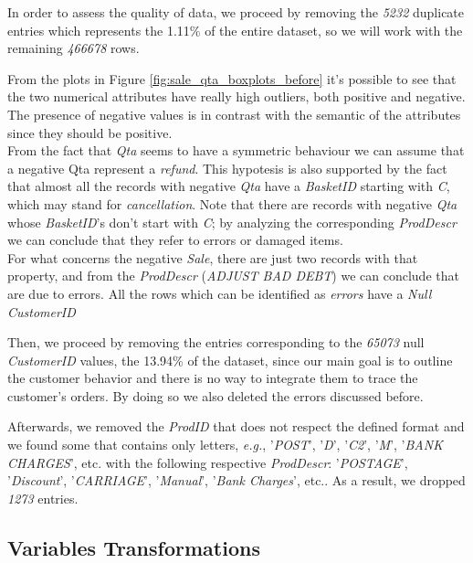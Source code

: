 In order to assess the quality of data, we proceed by removing the \emph{5232} duplicate entries which represents the 1.11\% of the entire dataset, so we will work with the remaining \emph{466678} rows.

From the plots in Figure \ref{fig:sale_qta_boxplots_before} it's possible to see that the two numerical attributes have really high outliers, both positive and negative. The presence of negative values is in contrast with the semantic of the attributes since they should be positive.\\
From the fact that \emph{Qta} seems to have a symmetric behaviour we can assume that a negative Qta represent a \emph{refund}. This hypotesis is also supported by the fact that almost all the records with negative \emph{Qta} have a \emph{BasketID} starting with \emph{C}, which may stand for \emph{cancellation}. Note that there are records with negative \emph{Qta} whose \emph{BasketID}'s don't start with \emph{C}; by analyzing the corresponding \emph{ProdDescr} we can conclude that they refer to errors or damaged items.\\
For what concerns the negative \emph{Sale}, there are just two records with that property, and from the \emph{ProdDescr} (\emph{ADJUST BAD DEBT}) we can conclude that are due to errors. All the rows which can be identified as \emph{errors} have a \emph{Null} \emph{CustomerID}

Then, we proceed by removing the entries corresponding to the \emph{65073} null \emph{CustomerID} values, the 13.94\% of the dataset, since our main goal is to outline the customer behavior and there is no way to integrate them to trace the customer's orders. By doing so we also deleted the errors discussed before.

Afterwards, we removed the \emph{ProdID} that does not respect the defined format and we found some that contains only letters, \emph{e.g.}, '\emph{POST}', '\emph{D}', '\emph{C2}', '\emph{M}', '\emph{BANK CHARGES}', etc. with the following respective \emph{ProdDescr}: '\emph{POSTAGE}', '\emph{Discount}', '\emph{CARRIAGE}', '\emph{Manual}', '\emph{Bank Charges}', etc.. As a result, we dropped \emph{1273} entries.

\pagebreak
\subsection{Variables Transformations}

